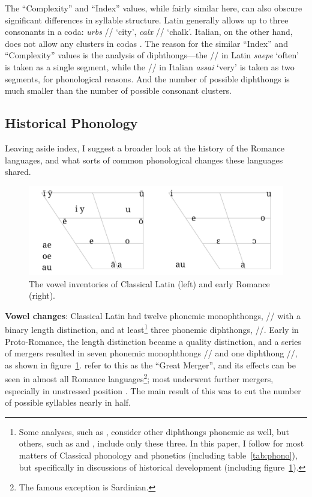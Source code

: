 \documentclass[12pt,twoside]{article}
\newcommand{\ipa}[1]{/\textipa{#1}/}
\begin{document}
The ``Complexity'' and ``Index'' values, while fairly similar here, can also obscure significant differences in syllable structure. Latin generally allows up to three consonants in a coda: \emph{urbs} \ipa{urps} `city', \emph{calx} \ipa{kalks} `chalk'. Italian, on the other hand, does not allow any clusters in codas \citep{hall}. The reason for the similar ``Index'' and ``Complexity'' values is the analysis of diphthongs---the \ipa{a\textsubarch{e}} in Latin \emph{saepe} `often' is taken as a single segment, while the \ipa{a\textsubarch{i}} in Italian \emph{assai} `very' is taken as two segments, for phonological reasons. And the number of possible diphthongs is much smaller than the number of possible consonant clusters.

\subsection{Historical Phonology}

Leaving aside  index, I suggest a broader look at the history of the Romance languages, and what sorts of common phonological changes these languages shared.

\begin{figure}[h]
\centering
\caption{The vowel inventories of Classical Latin (left) and early Romance (right).}
\label{fig:vowels}
\noindent\includegraphics[width=\linewidth]{vowelchange}
\end{figure}

\textbf{Vowel changes}: Classical Latin had twelve phonemic monophthongs, \ipa{i y e a o u} with a binary length distinction, and at least\footnote{Some analyses, such as \citet{allen}, consider other diphthongs phonemic as well, but others, such as \citet{alkire} and \citet{boyd}, include only these three. In this paper, I follow \citeauthor{allen} for most matters of Classical phonology and phonetics (including table~\ref{tab:phono}), but \citet{alkire} specifically in discussions of historical development (including figure~\ref{fig:vowels}).} three phonemic diphthongs, \ipa{a\textsubarch{e} o\textsubarch{e} a\textsubarch{u}}. Early in Proto-Romance, the length distinction became a quality distinction, and a series of mergers resulted in seven phonemic monophthongs \ipa{i e E a O o u} and one diphthong \ipa{a\textsubarch{u}}, as shown in figure~\ref{fig:vowels}. \citet{alkire} refer to this as the ``Great Merger'', and its effects can be seen in almost all Romance languages\footnote{The famous exception is Sardinian.}; most underwent further mergers, especially in unstressed position \citep{alkire,boyd}. The main result of this was to cut the number of possible syllables nearly in half.
\end{document}
